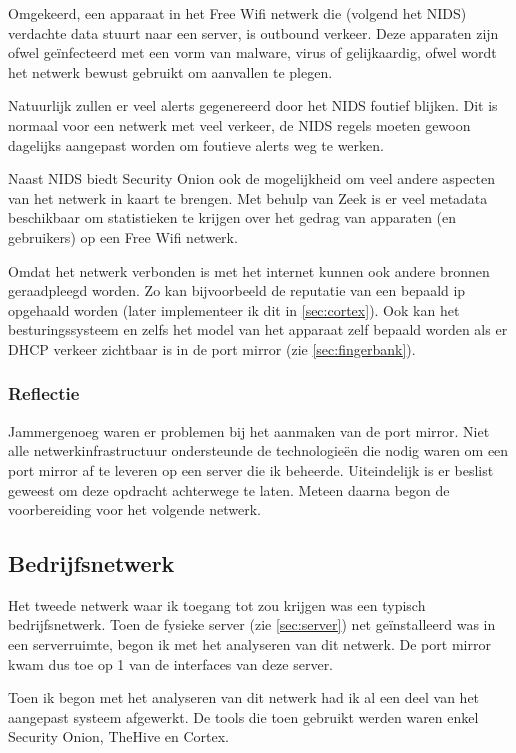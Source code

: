 \documentclass[a4paper,12pt]{report}
\begin{document}
Omgekeerd, een apparaat in het Free Wifi netwerk die (volgend het NIDS) verdachte data stuurt naar een server, is outbound verkeer.
Deze apparaten zijn ofwel geïnfecteerd met een vorm van malware, virus of gelijkaardig, ofwel wordt het netwerk bewust gebruikt om aanvallen te plegen.

Natuurlijk zullen er veel alerts gegenereerd door het NIDS foutief blijken.
Dit is normaal voor een netwerk met veel verkeer, de NIDS regels moeten gewoon dagelijks aangepast worden om foutieve alerts weg te werken.

Naast NIDS biedt Security Onion ook de mogelijkheid om veel andere aspecten van het netwerk in kaart te brengen.
Met behulp van Zeek is er veel metadata beschikbaar om statistieken te krijgen over het gedrag van apparaten (en gebruikers) op een Free Wifi netwerk.

Omdat het netwerk verbonden is met het internet kunnen ook andere bronnen geraadpleegd worden.
Zo kan bijvoorbeeld de reputatie van een bepaald ip opgehaald worden (later implementeer ik dit in \ref{sec:cortex}).
Ook kan het besturingssysteem en zelfs het model van het apparaat zelf bepaald worden als er DHCP verkeer zichtbaar is in de port mirror (zie \ref{sec:fingerbank}).

\subsubsection{Reflectie}
Jammergenoeg waren er problemen bij het aanmaken van de port mirror.
Niet alle netwerkinfrastructuur ondersteunde de technologieën die nodig waren om een port mirror af te leveren op een server die ik beheerde.
Uiteindelijk is er beslist geweest om deze opdracht achterwege te laten.
Meteen daarna begon de voorbereiding voor het volgende netwerk.

\subsection{Bedrijfsnetwerk}
Het tweede netwerk waar ik toegang tot zou krijgen was een typisch bedrijfsnetwerk.
Toen de fysieke server (zie \ref{sec:server}) net geïnstalleerd was in een serverruimte, begon ik met het analyseren van dit netwerk.
De port mirror kwam dus toe op 1 van de interfaces van deze server.

Toen ik begon met het analyseren van dit netwerk had ik al een deel van het aangepast systeem afgewerkt.
De tools die toen gebruikt werden waren enkel Security Onion, TheHive en Cortex.
\end{document}
